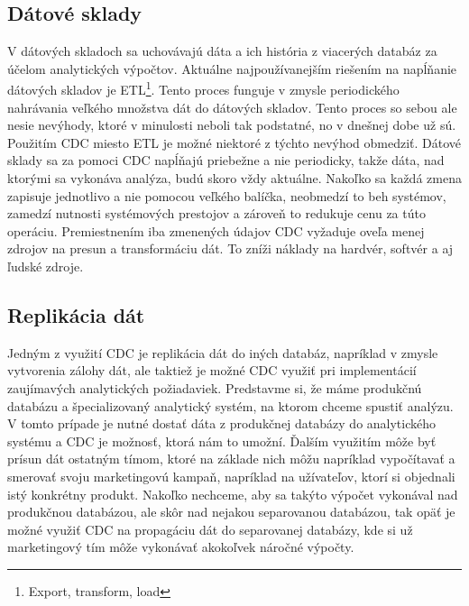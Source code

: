 \subsection{Dátové sklady}
V dátových skladoch sa uchovávajú dáta a ich história z viacerých databáz za účelom analytických výpočtov. Aktuálne najpoužívanejším riešením na napĺňanie dátových skladov je ETL\footnote{Export, transform, load}. Tento proces funguje v zmysle periodického nahrávania veľkého množstva dát do dátových skladov. Tento proces so sebou ale nesie nevýhody, ktoré v minulosti neboli tak podstatné, no v dnešnej dobe už sú. Použitím CDC miesto ETL je možné niektoré z týchto nevýhod obmedziť. Dátové sklady sa za pomoci CDC napĺňajú priebežne a nie periodicky, takže dáta, nad ktorými sa vykonáva analýza, budú skoro vždy aktuálne. Nakoľko sa každá zmena zapisuje jednotlivo a nie pomocou veľkého balíčka, neobmedzí to beh systémov, zamedzí nutnosti systémových prestojov a zároveň to redukuje cenu za túto operáciu. Premiestnením iba zmenených údajov CDC vyžaduje oveľa menej zdrojov na presun a transformáciu dát. To zníži náklady na hardvér, softvér a aj ľudské zdroje. \cite{attunity:etl_cdc}

\subsection{Replikácia dát}
Jedným z využití CDC je replikácia dát do iných databáz, napríklad v zmysle vytvorenia zálohy dát, ale taktiež je možné CDC využiť pri implementácií zaujímavých analytických požiadaviek. Predstavme si, že máme produkčnú databázu a špecializovaný analytický systém, na ktorom chceme spustiť analýzu. V tomto prípade je nutné dostať dáta z produkčnej databázy do analytického systému a CDC je možnosť, ktorá nám to umožní. Ďalším využitím môže byť prísun dát ostatným tímom, ktoré na základe nich môžu napríklad vypočítavať a smerovať svoju marketingovú kampaň, napríklad na užívateľov, ktorí si objednali istý konkrétny produkt. Nakoľko nechceme, aby sa takýto výpočet vykonával nad produkčnou databázou, ale skôr nad nejakou separovanou databázou, tak opäť je možné využiť CDC na propagáciu dát do separovanej databázy, kde si už marketingový tím môže vykonávať akokoľvek náročné výpočty.


